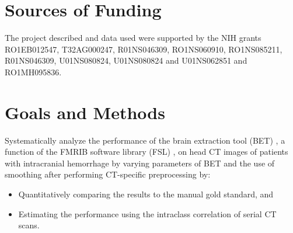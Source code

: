 \documentclass[final]{beamer}\usepackage[]{graphicx}\usepackage[]{color}
\begin{document}
\begin{frame}[fragile]
\begin{minipage}{0.2\linewidth}
\section{Sources of Funding}
{\scriptsize
The project described and data used were supported by the NIH grants RO1EB012547, T32AG000247, R01NS046309, RO1NS060910, RO1NS085211, R01NS046309, U01NS080824, U01NS080824 and U01NS062851 and RO1MH095836.
}
\end{minipage}
\begin{minipage}{0.39\linewidth}







\section{Goals and Methods}
\begin{multicols}{2}
Systematically analyze the performance of the brain extraction tool (BET) \citep{smith_fast_2002}, a function of the FMRIB software library (FSL) \citep{jenkinson_fsl_2012}, on head CT images of patients with intracranial hemorrhage by varying parameters of BET and the use of smoothing after performing CT-specific preprocessing by:
\begin{itemize}
\item Quantitatively comparing the results to the manual gold standard, and
\item Estimating the performance using the intraclass correlation of serial CT scans.
\end{itemize}


\vfill
\columnbreak





\end{multicols}
\end{minipage}
\end{frame}
\end{document}
